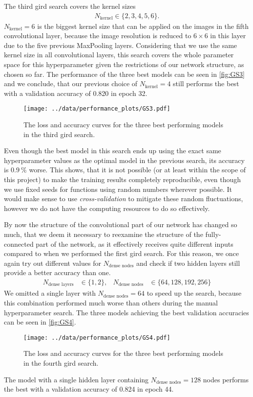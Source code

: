 The third gird search covers the kernel sizes
\begin{align}
    N_\text{kernel} \in \{2, 3, 4, 5, 6\}.
\end{align}
$N_\text{kernel} = 6$ is the biggest kernel size that can be applied on the images in the fifth convolutional layer, because the image resolution is reduced to $6\times 6$ in this layer 
due to the five previous MaxPooling layers.
Considering that we use the same kernel size in all convolutional layers, this search covers the whole parameter space for this hyperparameter given the restrictions of our network structure,
as chosen so far.
The performance of the three best models can be seen in \autoref{fig:GS3} and we conclude, that our previous choice of $N_\text{kernel} = 4$ still performs the best 
with a validation accuracy of 0.820 in epoch 32.
\begin{figure}
    \centering
    \texttt{[image: ../data/performance\_plots/GS3.pdf]}
    \caption{The loss and accuracy curves for the three best performing models in the third gird search.}
    \label{fig:GS3}
\end{figure}
Even though the best model in this search ends up using the exact same hyperparameter values as the optimal model in the previous search, its accuracy is $\SI{0.9}{\percent}$ worse.
This shows, that it is not possible (or at least within the scope of this project) to make the training results completely reproducible, even though we use fixed seeds for functions using
random numbers wherever possible. 
It would make sense to use \textit{cross-validation} to mitigate these random fluctuations, however we do not have the computing resources to do so effectively.

By now the structure of the convolutional part of our network has changed so much, that we deem it necessary to reexamine the structure of the fully-connected part of the network, 
as it effectively receives quite different inputs compared to when we performed the first gird search.
For this reason, we once again try out different values for $N_\text{dense nodes}$ and check if two hidden layers still provide a better accuracy than one.
\begin{align}
    N_\text{dense layers} &\in \{1, 2\}, &
    N_\text{dense nodes} &\in \{64, 128, 192, 256\}
\end{align}
We omitted a single layer with $N_\text{dense nodes} = 64$ to speed up the search, because this combination performed much worse than others during the manual hyperparameter search.
The three models achieving the best validation accuracies can be seen in \autoref{fig:GS4}.
\begin{figure}
    \centering
    \texttt{[image: ../data/performance\_plots/GS4.pdf]}
    \caption{The loss and accuracy curves for the three best performing models in the fourth gird search.}
    \label{fig:GS4}
\end{figure}
The model with a single hidden layer containing $N_\text{dense nodes} = 128$ nodes performs the best with a validation accuracy of 0.824 in epoch 44.


